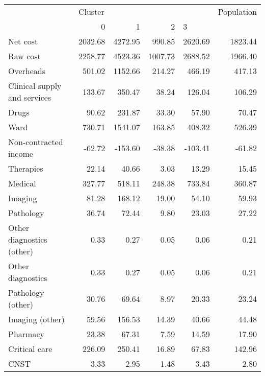 \begin{tabular}{lrrrrr}
\toprule
{} & \multicolumn{4}{l}{Cluster} & Population \\
{} &        0 &        1 &        2 & \multicolumn{2}{l}{3} \\
\midrule
Net cost                       &  2032.68 &  4272.95 &   990.85 &  2620.69 &    1823.44 \\
Raw cost                       &  2258.77 &  4523.36 &  1007.73 &  2688.52 &    1966.40 \\
Overheads                      &   501.02 &  1152.66 &   214.27 &   466.19 &     417.13 \\
Clinical supply and services   &   133.67 &   350.47 &    38.24 &   126.04 &     106.29 \\
Drugs                          &    90.62 &   231.87 &    33.30 &    57.90 &      70.47 \\
Ward                           &   730.71 &  1541.07 &   163.85 &   408.32 &     526.39 \\
Non-contracted income          &   -62.72 &  -153.60 &   -38.38 &  -103.41 &     -61.82 \\
Therapies                      &    22.14 &    40.66 &     3.03 &    13.29 &      15.45 \\
Medical                        &   327.77 &   518.11 &   248.38 &   733.84 &     360.87 \\
Imaging                        &    81.28 &   168.12 &    19.00 &    54.10 &      59.93 \\
Pathology                      &    36.74 &    72.44 &     9.80 &    23.03 &      27.22 \\
Other diagnostics (other)      &     0.33 &     0.27 &     0.05 &     0.06 &       0.21 \\
Other diagnostics              &     0.33 &     0.27 &     0.05 &     0.06 &       0.21 \\
Pathology (other)              &    30.76 &    69.64 &     8.97 &    20.33 &      23.24 \\
Imaging (other)                &    59.56 &   156.53 &    14.39 &    40.66 &      44.48 \\
Pharmacy                       &    23.38 &    67.31 &     7.59 &    14.59 &      17.90 \\
Critical care                  &   226.09 &   250.41 &    16.89 &    67.83 &     142.96 \\
CNST                           &     3.33 &     2.95 &     1.48 &     3.43 &       2.80 \\

\end{tabular}
